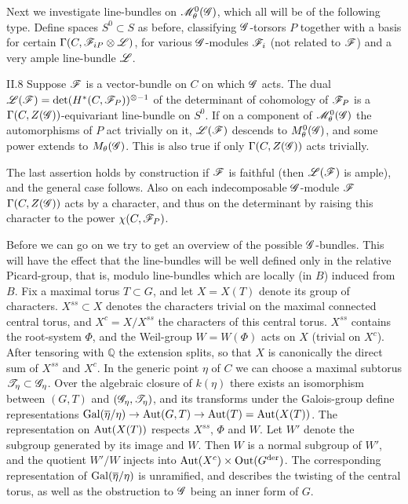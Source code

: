 \documentclass[12pt,english]{smfart}
\theoremstyle{plain} \newtheorem{innerthm}{Theorem} \newtheorem{innerlem}{Lemma} \newtheorem{innerprop}{Proposition} \newtheorem{innercor}{Corollary} \theoremstyle{definition} \newtheorem{innerdefn}{Definition} \newtheorem{innerconstr}{Construction} \theoremstyle{remark} \newtheorem*{remark}{Remark} \newtheorem*{remarks}{Remarks} \newtheorem*{applications}{Applications}
\begin{document}
Next we investigate line-bundles on $\mathscr{M}_\theta^0(\mathscr{G})$, which all will be of the following type. Define spaces $S^0\subset S$ as before, classifying $\mathscr{G}$-torsors $P$ together with a basis for certain $\Gamma(C,\mathscr{F}_{iP}\otimes\mathscr{L})$, for various $\mathscr{G}$-modules $\mathscr{F}_i$ (not related to $\mathscr{F}$) and a very ample line-bundle $\mathscr{L}$.

\begin{construction}{II.8}\label{constr:II.8}
Suppose $\mathscr{F}$ is a vector-bundle on $C$ on which $\mathscr{G}$ acts. The dual $\mathscr{L}(\mathscr{F})=\det(H^*(C,\mathscr{F}_P))^{\otimes-1}$ of the determinant of cohomology of $\mathscr{F}_P$ is a $\Gamma(C,Z(\mathscr{G}))$-equivariant line-bundle on $S^0$. If on a component of $\mathscr{M}_\theta^0(\mathscr{G})$ the automorphisms of $P$ act trivially on it, $\mathscr{L}(\mathscr{F})$ descends to $M_\theta^0(\mathscr{G})$, and some power extends to $M_\theta(\mathscr{G})$. This is also true if only $\Gamma(C,Z(\mathscr{G}))$ acts trivially.
\end{construction}

The last assertion holds by construction if $\mathscr{F}$ is faithful (then $\mathscr{L}(\mathscr{F})$ is ample), and the general case follows. Also on each indecomposable $\mathscr{G}$-module $\mathscr{F}$ $\Gamma(C,Z(\mathscr{G}))$ acts by a character, and thus on the determinant by raising this character to the power $\chi(C,\mathscr{F}_P)$.

Before we can go on we try to get an overview of the possible $\mathscr{G}$-bundles. This will have the effect that the line-bundles will be well defined only in the relative Picard-group, that is, modulo line-bundles which are locally (in $B$) induced from $B$. Fix a maximal torus $T\subset G$, and let $X=X(T)$ denote its group of characters. $X^{ss}\subset X$ denotes the characters trivial on the maximal connected central torus, and $X^c=X/X^{ss}$ the characters of this central torus. $X^{ss}$ contains the root-system $\Phi$, and the Weil-group $W=W(\Phi)$ acts on $X$ (trivial on $X^c$). After tensoring with $\mathbb{Q}$ the extension splits, so that $X$ is canonically the direct sum of $X^{ss}$ and $X^c$. In the generic point $\eta$ of $C$ we can choose a maximal subtorus $\mathscr{T}_\eta\subset\mathscr{G}_\eta$. Over the algebraic closure of $k(\eta)$ there exists an isomorphism between $(G,T)$ and $(\mathscr{G}_\eta,\mathscr{T}_\eta)$, and its transforms under the Galois-group define representations $\operatorname{Gal}(\overline\eta/\eta)\to\operatorname{Aut}(G,T)\to\operatorname{Aut}(T)=\operatorname{Aut}(X(T))$. The representation on $\operatorname{Aut}(X(T))$ respects $X^{ss}$, $\Phi$ and $W$. Let $W'$ denote the subgroup generated by its image and $W$. Then $W$ is a normal subgroup of $W'$, and the quotient $W'/W$ injects into $\operatorname{Aut}(X^c)\times\operatorname{Out}(G^{\mathrm{der}})$. The corresponding representation of $\operatorname{Gal}(\overline\eta/\eta)$ is unramified,
and describes the twisting of the central torus, as well as the obstruction to $\mathscr{G}$ being an inner form of $G$.
\end{document}
